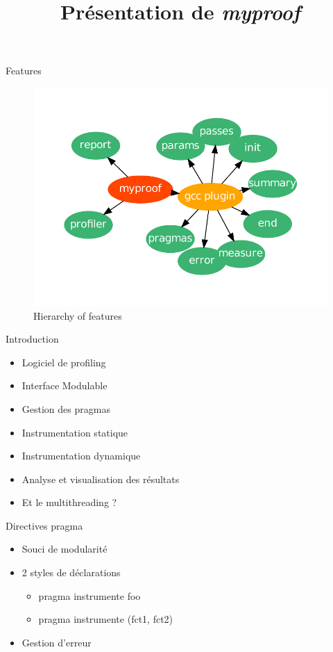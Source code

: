 \documentclass{beamer}
\title[Outil de profiling \emph{myproof}]{Présentation de \emph{myproof}}
\begin{document}
\begin{frame}
  \titlepage
\end{frame}

\begin{frame}{Features}
\begin{figure}[here]
  \centering
  \includegraphics[scale=0.7]{images/schema.pdf}
  \caption{Hierarchy of features}
\end{figure}
\end{frame}

\begin{frame}{Introduction}
  \begin{itemize}
  \item Logiciel de profiling
  \item Interface Modulable
  \item Gestion des pragmas
  \item Instrumentation statique
  \item Instrumentation dynamique
  \item Analyse et visualisation des résultats
  \item Et le multithreading ?
  \end{itemize}
\end{frame}

\begin{frame}{Directives pragma}
 \begin{itemize}
  \item Souci de modularité
  \item 2 styles de déclarations
    \begin{itemize}
    \item pragma instrumente foo
    \item pragma instrumente (fct1, fct2)
    \end{itemize}
  \item Gestion d'erreur
  \end{itemize}
 \end{frame}
\end{document}
